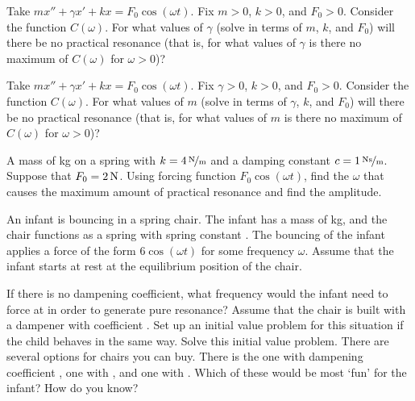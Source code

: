 \documentclass{ximera}
\begin{document}
\begin{exercise}
    Take $m x'' + \gamma x' + kx = F_0 \cos (\omega t)$. Fix $m > 0$, $k > 0$, and $F_0 > 0$.  Consider the function $C(\omega)$. For what values of $\gamma$ (solve in terms of $m$, $k$, and $F_0$) will there be no practical resonance (that is, for what values of $\gamma$ is there no maximum of $C(\omega)$ for $\omega > 0$)?
\end{exercise}

\begin{exercise}
    Take $m x'' + \gamma x' + kx = F_0 \cos (\omega t)$. Fix $\gamma > 0$, $k > 0$, and $F_0 > 0$.  Consider the function $C(\omega)$. For what values of $m$ (solve in terms of $\gamma$, $k$, and $F_0$) will there be no practical resonance (that is, for what values of $m$ is there no maximum of $C(\omega)$ for $\omega > 0$)?
\end{exercise}

\begin{exercise}%
    A mass of \unit[4]{kg} on a spring with $k=\unitfrac[4]{N}{m}$ and a damping constant $c=\unitfrac[1]{Ns}{m}$. Suppose that $F_0 = \unit[2]{N}$.  Using forcing function $F_0 \cos (\omega t)$, find the $\omega$ that causes the maximum amount of practical resonance and find the amplitude.
\end{exercise}

\begin{exercise}
    An infant is bouncing in a spring chair. The infant has a mass of \unit[8]{kg}, and the chair functions as a spring with spring constant . The bouncing of the infant applies a force of the form $6 \cos(\omega t)$ for some frequency $\omega$. Assume that the infant starts at rest at the equilibrium position of the chair.
    \begin{tasks}
        \task If there is no dampening coefficient, what frequency would the infant need to force at in order to generate pure resonance?
        \task Assume that the chair is built with a dampener with coefficient . Set up an initial value problem for this situation if the child behaves in the same way.
        \task Solve this initial value problem.
        \task There are several options for chairs you can buy. There is the one with dampening coefficient , one with , and one with . Which of these would be most `fun' for the infant? How do you know?
    \end{tasks}
\end{exercise}
\end{document}

